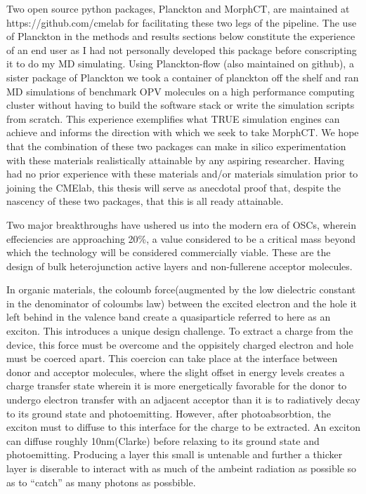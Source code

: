 Two open source python packages, Planckton and MorphCT, are maintained at https://github.com/cmelab for
facilitating these two legs of the pipeline. The use of Planckton in the methods and results sections below
constitute the experience of an end user as I had not personally developed this package before conscripting it
to do my MD simulating. Using Planckton-flow (also maintained on github), a sister package
of Planckton we took a container of planckton off the shelf and ran MD simulations of benchmark OPV
molecules on a high performance computing cluster without having to build the software stack or write the
simulation scripts from scratch. This experience exemplifies what TRUE simulation engines can achieve and
informs the direction with which we seek to take MorphCT. We hope that the combination of these two packages
can make in silico experimentation with these materials realistically attainable by any aspiring researcher.
Having had no prior experience with these materials and/or materials simulation prior to joining the CMElab,
this thesis will serve as anecdotal proof that, despite the nascency of these two packages, that this is all
ready attainable. 

Two major breakthroughs have ushered us into the modern era of OSCs, wherein effeciencies are approaching 20\%,
a value considered to be a critical mass beyond which the technology will be considered commercially viable.
These are the design of bulk heterojunction active layers and non-fullerene acceptor molecules. 

In organic materials, the coloumb force(augmented by the low dielectric constant in the denominator of coloumbs law) between the excited
electron and the hole it left behind in the valence band create a quasiparticle referred to here as an exciton. 
This introduces a unique design challenge. 
To extract a charge from the device, this force must be overcome and the oppisitely charged electron and hole 
must be coerced apart. This coercion can take place at the interface between donor and acceptor molecules,
where the slight offset in energy levels creates a charge transfer state wherein it is more
energetically favorable for the donor to undergo electron transfer with an adjacent acceptor than
it is to radiatively decay to its ground state and photoemitting.
However, after photoabsorbtion, the exciton must to diffuse to this interface for the charge to be
extracted. An exciton can diffuse roughly 10nm(Clarke) before relaxing
to its ground state and photoemitting. Producing a layer this small is untenable and further a thicker layer
is diserable to interact with as much of the ambeint radiation as possible so as to ``catch'' as many photons
as possbible. 

